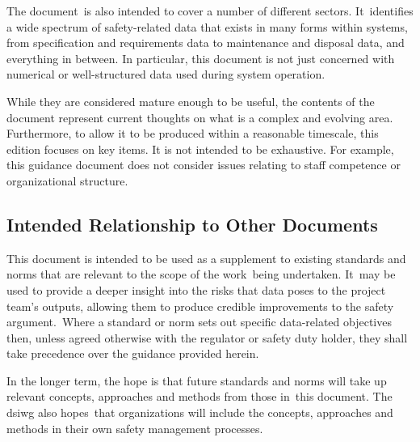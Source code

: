 \cbstart The document\cbend\ is also intended to cover a number of different sectors. \cbstart It\cbend\ identifies a wide spectrum of safety-related data that exists in many forms within systems, from specification and requirements data to maintenance and disposal data, and everything in between. In particular, this document is not just concerned with numerical or well-structured data used during system operation.

\cbstart While \cbend they are considered mature enough to be useful, the contents of the document represent current thoughts on what is a complex and evolving area. Furthermore, to allow it to be produced within a reasonable timescale, this edition focuses on key items. It is not intended to be exhaustive. For example, this guidance document does not consider issues relating to staff competence or organizational structure.

\subsection{Intended Relationship to Other Documents}
This document is intended to be used as a supplement to existing standards and norms that are relevant to the scope of the \cbstart work\cbend\ being undertaken. \cbstart It\cbend\ may be used to provide a deeper insight into the risks that data poses to the project team's outputs, allowing them to produce credible improvements to the safety \cbstart argument.\cbend\ Where a standard or norm sets out specific data-related objectives then, unless agreed otherwise with the regulator or safety duty holder, they shall take precedence over the guidance provided herein.

In the longer term, the hope is that future standards and norms will take up relevant concepts, approaches and methods from those \cbstart in\cbend\ this document. \cbstart The \gls{dsiwg} also hopes\cbend\ that organizations will include the concepts, approaches and methods in their own safety management processes.

\clearpage %

